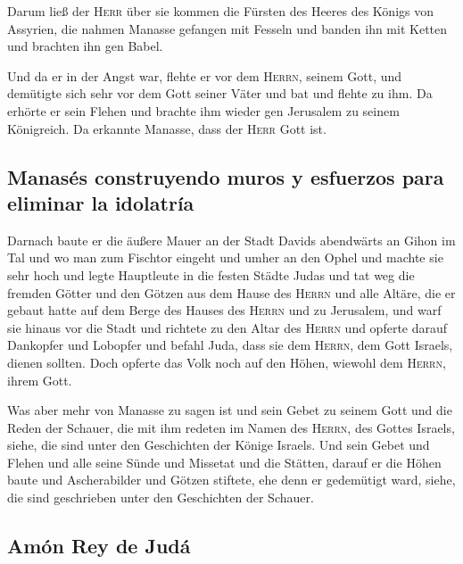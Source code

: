  Darum ließ der \textsc{Herr} über sie kommen die Fürsten
des Heeres des Königs von Assyrien, die nahmen Manasse gefangen mit
Fesseln und banden ihn mit Ketten und brachten ihn gen Babel.

 Und da er in der Angst war, flehte er vor dem
\textsc{Herrn}, seinem Gott, und demütigte sich sehr vor dem Gott seiner
Väter  und bat und flehte zu ihm. Da erhörte er sein
Flehen und brachte ihm wieder gen Jerusalem zu seinem Königreich. Da
erkannte Manasse, dass der \textsc{Herr} Gott ist.

\hypertarget{manasuxe9s-construyendo-muros-y-esfuerzos-para-eliminar-la-idolatruxeda}{%
\subsection{Manasés construyendo muros y esfuerzos para eliminar la
idolatría}\label{manasuxe9s-construyendo-muros-y-esfuerzos-para-eliminar-la-idolatruxeda}}

 Darnach baute er die äußere Mauer an der Stadt Davids
abendwärts an Gihon im Tal und wo man zum Fischtor eingeht und umher an
den Ophel und machte sie sehr hoch und legte Hauptleute in die festen
Städte Judas  und tat weg die fremden Götter und den
Götzen aus dem Hause des \textsc{Herrn} und alle Altäre, die er gebaut
hatte auf dem Berge des Hauses des \textsc{Herrn} und zu Jerusalem, und
warf sie hinaus vor die Stadt  und richtete zu den Altar
des \textsc{Herrn} und opferte darauf Dankopfer und Lobopfer und befahl
Juda, dass sie dem \textsc{Herrn}, dem Gott Israels, dienen sollten.
 Doch opferte das Volk noch auf den Höhen, wiewohl dem
\textsc{Herrn}, ihrem Gott.

 Was aber mehr von Manasse zu sagen ist und sein Gebet zu
seinem Gott und die Reden der Schauer, die mit ihm redeten im Namen des
\textsc{Herrn}, des Gottes Israels, siehe, die sind unter den
Geschichten der Könige Israels.  Und sein Gebet und
Flehen und alle seine Sünde und Missetat und die Stätten, darauf er die
Höhen baute und Ascherabilder und Götzen stiftete, ehe denn er
gedemütigt ward, siehe, die sind geschrieben unter den Geschichten der
Schauer.

\hypertarget{amuxf3n-rey-de-juduxe1}{%
\subsection{Amón Rey de Judá}\label{amuxf3n-rey-de-juduxe1}}

